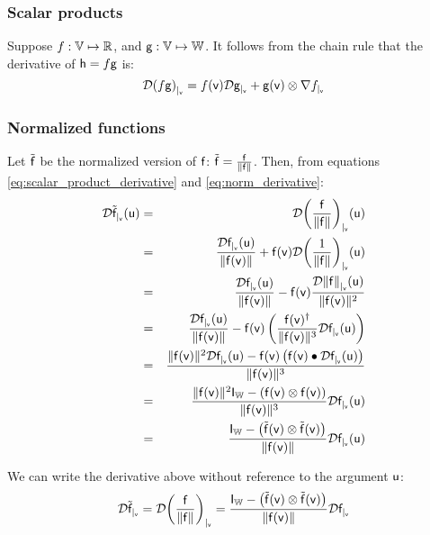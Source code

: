 
\subsubsection{Scalar products}
\label{sec:Scalar-products}

Suppose
$f:\Vspace \mapsto \Reals$, and
$\g:\Vspace \mapsto \Wspace$.
It follows from the chain rule that the derivative of $\h = f\g$ is:
\begin{equation}
\label{eq:scalar_product_derivative}
\Db{(f\g)}{\v} =  f(\v) \Db{\g}{\v} + \g(\v) \otimes \Gb{f}{\v}
\end{equation}



\subsubsection{Normalized functions}
\label{sec:Normalized-functions}

Let $\tilde{\f}$ be the normalized version of $\f$:
$\tilde{\f}  =  \frac{\f}{\| \f \|}$.
Then, from equations \ref{eq:scalar_product_derivative}
and \ref{eq:norm_derivative}:
\begin{eqnarray}
\Dc{\tilde{\f}}{\v}{\u}
& = &
\Dc{\left( \frac{\f}{\| \f \|}\right)}{\v}{\u}
\\
& = &
\frac{\Dc{\f}{\v}{\u}}{ \| \f(\v) \|}
 +
\f(\v)  \Dc{ \left( \frac{1}{\| \f \|} \right) }{\v}{\u} \nonumber \\
& = &
\frac{\Dc{\f}{\v}{\u}}
{\| \f(\v) \|}
 -
\f(\v)
\frac{\Dc{\| \f \|}{\v}{\u}}
{\|\f(\v)\|^2} \nonumber \\
& = &
\frac{\Dc{\f}{\v}{\u}}{ \| \f(\v) \| }
 -
\f(\v) \left( \frac{\f(\v)^\dagger}{\| \f(\v) \|^3}  \Dc{\f}{\v}{\u} \right) \nonumber \\
& = &
\frac{
\| \f(\v) \|^2 \Dc{\f}{\v}{\u}
 -
\f(\v)\left( \f(\v) \bullet \Dc{\f}{\v}{\u} \right)
}
{\| \f(\v) \|^3}  \nonumber \\
& = &
\frac{\| \f(\v) \|^2 \Identity_{\Wspace} - \left( \f(\v) \otimes \f(\v) \right)  }
{ \| \f(\v) \|^3 }
\Dc{\f}{\v}{\u} \nonumber \\
& = &
\frac{\Identity_{\Wspace} - \left( \tilde{\f}(\v) \otimes \tilde{\f}(\v) \right)  }
{\| \f(\v) \|}
\Dc{\f}{\v}{\u} \nonumber
\end{eqnarray}


We can write the derivative above without reference to the argument $\u$:
\begin{equation}
\label{eq:normalized_function_derivative}
\Db{\tilde{\f}}{\v}
 =
\Db{\left( \frac{\f}{\| \f \|} \right)}{\v}
 =
\frac{\Identity_{\Wspace} - \left( \tilde{\f}(\v) \otimes \tilde{\f}(\v) \right) }
{ \| \f(\v) \| }
\Db{\f}{\v}
\end{equation}

